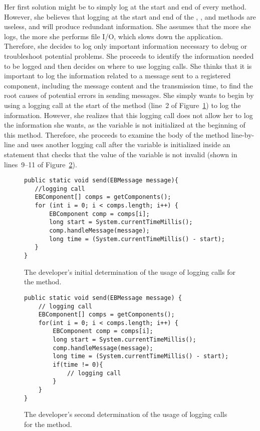 Her first solution might be to simply log at the start and end of every method. However, she believes that logging at the start and end of the , \-\-, and  methods are useless, and will produce redundant information. She assumes that the more she logs, the more she performs file I/O, which slows down the application. Therefore, she decides to log only important information necessary to debug or troubleshoot potential problems. She proceeds to identify the information needed to be logged and then decides on where to use logging calls. She thinks that it is important to log the information related to a message sent to a registered component, including the message content and the transmission time, to find the root causes of potential errors in sending messages. She simply wants to begin by using a logging call at the start of the  method (line~2 of Figure~\ref{ch2-ex-logged-m1}) to log the information. However, she realizes that this logging call does not allow her to log the information she wants, as the  variable is not initialized at the beginning of this method. Therefore, she proceeds to examine the body of the  method line-by-line and uses another logging call after the  variable is initialized inside an  statement that checks that the value of the variable  is not invalid (shown in lines~9--11 of Figure~\ref{ch2-ex-logged-m2}).

\begin{figure}[p]
\def\baselinestretch{1}
\begin{lstlisting}
public static void send(EBMessage message){
   //logging call
   EBComponent[] comps = getComponents();
   for (int i = 0; i < comps.length; i++) {
       EBComponent comp = comps[i];
       long start = System.currentTimeMillis();
       comp.handleMessage(message);
       long time = (System.currentTimeMillis() - start);
   }
}
\end{lstlisting}
\caption[The developer's initial determination of the usage of logging calls.]{The developer's initial determination of the usage of logging calls for the  method.\label{ch2-ex-logged-m1}}
\end{figure}

\begin{figure}[p]
\def\baselinestretch{1}
\begin{lstlisting}
public static void send(EBMessage message) {
    // logging call
    EBComponent[] comps = getComponents();
    for(int i = 0; i < comps.length; i++) {
        EBComponent comp = comps[i];
        long start = System.currentTimeMillis();
        comp.handleMessage(message);
        long time = (System.currentTimeMillis() - start);
        if(time != 0){
            // logging call
        }
    }
}
\end{lstlisting}
\caption[The developer's second determination of the usage of logging calls.]{The developer's second determination of the usage of logging calls for the  method.\label{ch2-ex-logged-m2}}
\end{figure}

